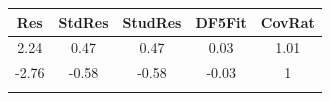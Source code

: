 \documentclass[]{article}
\begin{document}
\begin{longtable}[]{@{}ccccc@{}}
\toprule
\begin{minipage}[b]{0.10\columnwidth}\centering\strut
Res\strut
\end{minipage} & \begin{minipage}[b]{0.11\columnwidth}\centering\strut
StdRes\strut
\end{minipage} & \begin{minipage}[b]{0.12\columnwidth}\centering\strut
StudRes\strut
\end{minipage} & \begin{minipage}[b]{0.11\columnwidth}\centering\strut
DF5Fit\strut
\end{minipage} & \begin{minipage}[b]{0.11\columnwidth}\centering\strut
CovRat\strut
\end{minipage}\tabularnewline
\midrule
\endhead
\begin{minipage}[t]{0.10\columnwidth}\centering\strut
2.24\strut
\end{minipage} & \begin{minipage}[t]{0.11\columnwidth}\centering\strut
0.47\strut
\end{minipage} & \begin{minipage}[t]{0.12\columnwidth}\centering\strut
0.47\strut
\end{minipage} & \begin{minipage}[t]{0.11\columnwidth}\centering\strut
0.03\strut
\end{minipage} & \begin{minipage}[t]{0.11\columnwidth}\centering\strut
1.01\strut
\end{minipage}\tabularnewline
\begin{minipage}[t]{0.10\columnwidth}\centering\strut
-2.76\strut
\end{minipage} & \begin{minipage}[t]{0.11\columnwidth}\centering\strut
-0.58\strut
\end{minipage} & \begin{minipage}[t]{0.12\columnwidth}\centering\strut
-0.58\strut
\end{minipage} & \begin{minipage}[t]{0.11\columnwidth}\centering\strut
-0.03\strut
\end{minipage} & \begin{minipage}[t]{0.11\columnwidth}\centering\strut
1\strut
\end{minipage}\tabularnewline
\begin{minipage}[t]{0.10\columnwidth}\centering\strut

\end{minipage}
\end{longtable}
\end{document}
